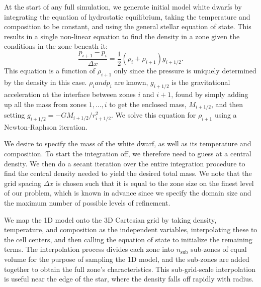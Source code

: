\documentclass[12pt,preprint]{aastex}
\begin{document}
At the start of any full simulation, we generate initial model white dwarfs by integrating the equation of hydrostatic equilibrium, taking the temperature and composition to be constant, and using the general stellar equation of state.  This results in a single non-linear equation to find the density in a zone given the conditions in the zone beneath it:
\begin{equation}
\frac{p_{i+1} - p_i}{\Delta x} = \frac{1}{2} (\rho_i + \rho_{i+1}) g_{i+1/2}.
\end{equation}
This equation is a function of $\rho_{i+1}$ only since the pressure is uniquely determined by the density in this case. $\rho_i and p_i$ are known,  $g_{i+1/2}$ is the gravitational acceleration at the interface between zones $i$ and $i+1$, found by simply adding up all the mass from zones $1, \ldots, i$ to get the enclosed mass, $M_{i+1/2}$, and then setting $g_{i+1/2} = -GM_{i+1/2}/r_{i+1/2}^2$. We solve this equation for $\rho_{i+1}$ using a Newton-Raphson iteration.

We desire to specify the mass of the white dwarf, as well as its temperature and composition. To start the integration off, we therefore need to guess at a central density.  We then do a secant iteration over the entire integration procedure to find the central density needed to yield the desired total mass.  We note that the grid spacing $\Delta x$ is chosen such that it is equal to the zone size on the finest level of our problem, which is known in advance since we specify the domain size and the maximum number of possible levels of refinement.

We map the 1D model onto the 3D Cartesian grid by taking density, temperature, and composition as the independent variables, interpolating these to the cell centers, and then calling the equation of state to initialize the remaining terms.  The interpolation process divides each zone into $n_{\text{sub}}$ sub-zones of equal volume for the purpose of sampling the 1D model, and the sub-zones are added together to obtain the full zone's characteristics. This sub-grid-scale interpolation is useful near the edge of the star, where the density falls off rapidly with radius.
\end{document}

